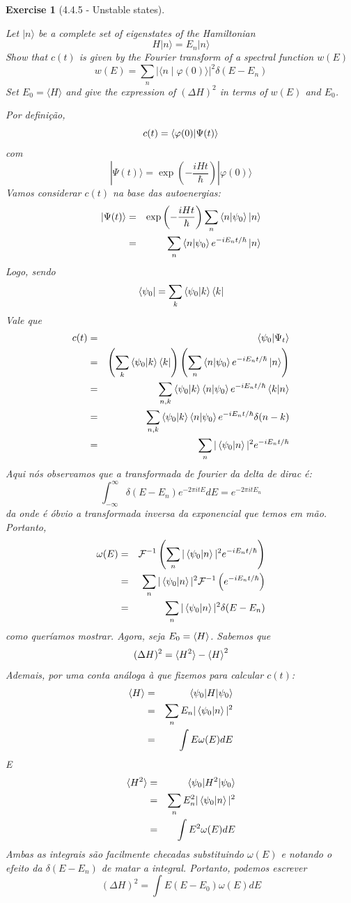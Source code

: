 \documentclass[12pt]{article}
\def\be{\begin{equation}}
\def\ee{\end{equation}}
\def\bea{\begin{eqnarray*}}
\def\eea{\end{eqnarray*}}
\def\l{\left}
\def\r{\right}
\newtheorem{exercise}{Exercise}
\begin{document}
\begin{exercise}[4.4.5 - Unstable states]
\begin{exercises}
			\item Let $|n\rangle$ be a complete set of eigenstates of the Hamiltonian
			$$
			H|n\rangle=E_{n}|n\rangle
			$$
			Show that $c(t)$ is given by the Fourier transform of a spectral function $w(E)$
			$$
			w(E)=\sum_{n}|\langle n \mid \varphi(0)\rangle|^{2} \delta\left(E-E_{n}\right)
			$$
			Set $E_{0}=\langle H\rangle$ and give the expression of $(\Delta H)^{2}$ in terms of $w(E)$ and $E_{0}$.
			\begin{multianswer}
				Por definição,
				\be
					c(t)=\braket{\varphi(0) | \Psi(t)}
				\ee
				com
				\be
					|\Psi(t)\rangle=\exp\left(-\frac{i H t}{\hbar}\right)|\varphi(0)\rangle
				\ee
				Vamos considerar $c(t)$ na base das autoenergias:
				\bea
					\ket{\Psi(t)} &=& \exp\left(-\frac{i H t}{\hbar}\right) \sum_{n} \braket{n|\psi_0}\ket{n} \\
						&=& \sum_n \braket{n|\psi_0} e^{-iE_nt/\hbar} \ket{n}
				\eea
				Logo, sendo 
				\be
					\bra{\psi_0} = \sum_k \braket{\psi_0|k}\bra{k}
				\ee
				Vale que
				\bea
					c(t) &=& \braket{\psi_0|\Psi_t} \\
						&=& \l(\sum_k \braket{\psi_0|k}\bra{k}\r)\l( \sum_n \braket{n|\psi_0} e^{-iE_nt/\hbar} \ket{n}\r) \\
						&=& \sum_{n, k} \braket{\psi_0|k} \braket{n|\psi_0} e^{-iE_nt/\hbar} \braket{k|n} \\
						&=& \sum_{n, k} \braket{\psi_0|k} \braket{n|\psi_0} e^{-iE_nt/\hbar} \delta(n-k) \\
						&=& \sum_n |\braket{\psi_0|n}|^2e^{-iE_nt/\hbar}
				\eea
				Aqui nós observamos que a transformada de fourier da delta de dirac é:
				\be
					\int_{-\infty}^{\infty} \delta(E-E_n) e^{-2\pi i tE} dE = e^{-2\pi i tE_n}
				\ee
				da onde é óbvio a transformada inversa da exponencial que temos em mão. Portanto,
				\bea
				\omega(E) &=& \mathcal{F}^{-1} \l( \sum_n |\braket{\psi_0|n}|^ 2e^{-iE_nt/\hbar}\r) \\
					&=&  \sum_n |\braket{\psi_0|n}|^2 \mathcal{F}^{-1}\l(e^{-iE_nt/\hbar}\r) \\
					&=& \sum_n |\braket{\psi_0|n}|^2 \delta(E-E_n)
				\eea
				como queríamos mostrar. Agora, seja $E_0=\braket{H}$. Sabemos que
				\be
					(\Delta H)^2 = \braket{H^2} - \braket{H}^2 
				\ee
				Ademais, por uma conta análoga à que fizemos para calcular $c(t)$:
				\bea
					\braket{H} &=& \braket{\psi_0 | H | \psi_0} \\
						&=& \sum_n E_n |\braket{\psi_0|n}|^2 \\
						&=& \int E\omega(E) dE
				\eea
				E
				\bea
					\braket{H^2} &=& \braket{\psi_0 | H^2 | \psi_0} \\
					&=& \sum_n E_n^2 |\braket{\psi_0|n}|^2 \\
					&=& \int E^2\omega(E) dE
				\eea
				Ambas as integrais são facilmente checadas substituindo $\omega(E)$ e notando o efeito da $\delta(E-E_n)$ de matar a integral. Portanto, podemos escrever
				\be
					(\Delta H)^2 = \int E(E - E_0)\omega(E) dE
				\ee
				

\end{multianswer}
\end{exercises}
\end{exercise}
\end{document}
